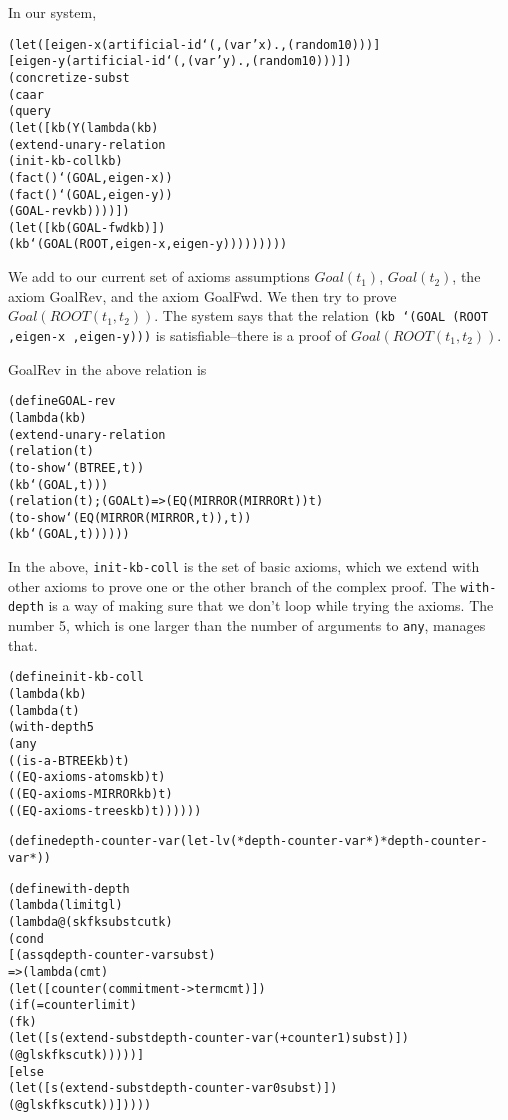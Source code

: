 In our system,
\begin{alltt}
(let ([eigen-x (artificial-id `(,(var 'x) . ,(random 10)))]
        [eigen-y (artificial-id `(,(var 'y) . ,(random 10)))])
    (concretize-subst
      (caar
        (query
          (let ([kb (Y (lambda (kb)
                         (extend-unary-relation
                           (init-kb-coll kb)
                           (fact () `(GOAL ,eigen-x))
                           (fact () `(GOAL ,eigen-y))
                           (GOAL-rev kb))))])
            (let ([kb (GOAL-fwd kb)])
              (kb `(GOAL (ROOT ,eigen-x ,eigen-y)))))))))
\end{alltt}

We add to our current set of axioms assumptions $Goal(t_{1})$, $Goal(t_{2})$,
the axiom GoalRev, and the axiom GoalFwd. We then try to
prove $Goal(ROOT(t_{1},t_{2}))$. The system says that the relation
\texttt{(kb `(GOAL (ROOT ,eigen-x ,eigen-y)))} is satisfiable--there is a
proof of $Goal(ROOT(t_{1},t_{2}))$.

GoalRev in the above relation is
\begin{alltt}
(define GOAL-rev
  (lambda (kb)
    (extend-unary-relation
      (relation (t)
        (to-show `(BTREE ,t))
        (kb `(GOAL ,t)))
      (relation (t)                ; (GOAL t) => (EQ (MIRROR (MIRROR t)) t)
        (to-show `(EQ (MIRROR (MIRROR ,t)) ,t))
        (kb `(GOAL ,t))))))
\end{alltt}

In the above, \texttt{init-kb-coll} is the set of basic axioms, which we extend
with other axioms to prove one or the other branch of the complex
proof.  The \texttt{with-depth} is a way of making
sure that we don't loop while trying the axioms.  The number 5, which
is one larger than the number of arguments to \texttt{any}, manages
that.

\begin{alltt}
(define init-kb-coll
  (lambda (kb)
    (lambda (t)
      (with-depth 5
        (any
          ((is-a-BTREE kb) t)
          ((EQ-axioms-atoms kb) t)
          ((EQ-axioms-MIRROR kb) t)
          ((EQ-axioms-trees kb) t))))))

(define depth-counter-var (let-lv (*depth-counter-var*) *depth-counter-var*))

(define with-depth
  (lambda (limit gl)
    (lambda@ (sk fk subst cutk)
      (cond
        [(assq depth-counter-var subst)
         => (lambda (cmt)
              (let ([counter (commitment->term cmt)])
                (if (= counter limit)
                  (fk)
                  (let ([s (extend-subst depth-counter-var (+ counter 1) subst)])
                    (@ gl sk fk s cutk)))))]
        [else
          (let ([s (extend-subst depth-counter-var 0 subst)])
            (@ gl sk fk s cutk))]))))
\end{alltt}

